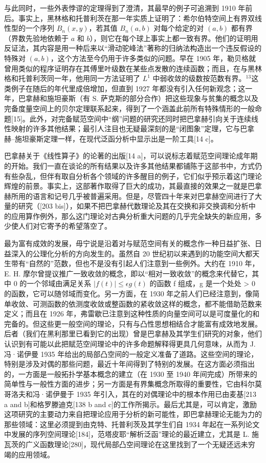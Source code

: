 与此同时，一些外表悖谬的定理得到了澄清，其最早的例子可追溯到 1910 年前后。事实上，黑林格和托普利茨在那一年实质上证明了：希尔伯特空间上有界双线性型的一个序列 \(B_n(x,y)\)，若其值 \(B_n(a,b)\) 对每个给定的对 \((a,b)\) 都有界（界数先验地依赖于 \(a\) 和 \(b\)），则它在每个球上事实上都一致有界。他们的证明用反证法，其内容是用一种后来以“滑动驼峰法”著称的归纳法构造出一个违反假设的特殊对 \((a,b)\)，这个方法至今仍用于许多类似的问题。早在 1905 年，勒贝格就曾用类似的程序证明存在其傅里叶级数在某些点发散的连续函数；而且，在与黑林格和托普利茨同一年，他用同一方法证明了 \(L^1\) 中弱收敛的级数按范数有界。\(^{13}\)这类例子在随后的年代里成倍增加，但直到 1927 年都没有引入任何新观念；这一年，巴拿赫和施坦豪斯（有 S. 萨克斯的部分合作）把这些现象与贫集的概念以及完备度量空间上的贝尔定理联系起来，得到了一个涵盖此前所有特殊情形的一般命题{[}15{]}。此外，对完备赋范空间中“纲”问题的研究还同时把巴拿赫引向关于连续线性映射的许多其他结果；最引人注目也无疑最深刻的是“闭图象”定理，它与巴拿赫–施坦豪斯定理一样，在现代泛函分析中显示出是一阶工具{[}14 c{]}。

巴拿赫关于《线性算子》的论著的出版{[}14 a{]}，可以说标志着赋范空间理论成年期的开始。我们一直在谈论的所有结果以及许多其他结果都铺陈于这部书中，方式仍有些杂乱，但伴有取自分析各个领域的许多醒目的例子，它们似乎预示着这门理论辉煌的前景。事实上，这部著作取得了巨大的成功，其最直接的效果之一就是巴拿赫所用的语言和记号几乎被普遍采用。但是，尽管四十年来对巴拿赫空间进行了大量的研究（{[}203 bis{]}），如果不把巴拿赫代数理论及其在交换和非交换调和分析中的应用算作例外，那么这门理论对古典分析重大问题的几乎完全缺失的新应用，多少使人们对它寄予的希望落空了。

最为富有成效的发展，毋宁说是沿着对与赋范空间有关的概念作一种日益扩张、日益深入的公理化分析的方向发生的。虽然自 20 世纪初以来遇到的功能空间大都天生带有“自然的”范数，但也不是没有引起人们注意到一些例外。大约在 1910 年，E. H. 摩尔曾提议推广一致收敛的概念，即以“相对一致收敛”的概念来代替它，其中 0 的一个邻域由满足关系 \(|f(t)| \leq \epsilon g(t)\) 的函数 f 组成，g 是一个处处 \textgreater{} 0 的函数，它可以随邻域而变化。另一方面，在 1930 年之前人们已经注意到，像简单收敛、可测函数的依测度收敛或整函数的紧收敛这样的概念，都不能借助范数来定义；而且在 1926 年，弗雷歇已注意到这种性质的向量空间可以是可度量化的和完备的。但这些更一般空间的理论，只有与凸性思想相结合才能富有成效地发展。后者（我们在黑利那里已看到它的出现）曾是巴拿赫及其学生们研究的对象，他们认识到有可能以此把赋范空间理论中的许多命题解释得更具几何意味，从而为 J. 冯·诺伊曼 1935 年给出的局部凸空间的一般定义准备了道路。这些空间的理论，特别是涉及对偶的那些问题，最近十年间得到了特别的发展。在这方面必须指出的，一方面是一般拓扑学基本概念的建立（在 1930 至 1940 年间完成）所带来的简单性与一般性方面的进步；另一方面是有界集概念所取得的重要性，它由科尔莫哥洛夫和冯·诺伊曼于 1935 年引入，其在的对偶理论中的根本作用已由麦基{[}213 a and b{]}和格罗滕迪克{[}138 b and c{]}的工作所揭示。最后尤其是，可以肯定，激励这项研究的主要动力来自把理论应用于分析的新可能性，即巴拿赫理论无能为力的那些领域：这里必须提到由克特、托普利茨及其学生们自 1934 年起在一系列论文中发展的序列空间理论{[}184{]}，范塔皮耶“解析泛函”理论的最近建立，尤其是 L. 施瓦茨的广义函数理论{[}280{]}，现代局部凸空间理论在这里找到了一个无疑还远未穷竭的应用领域。

